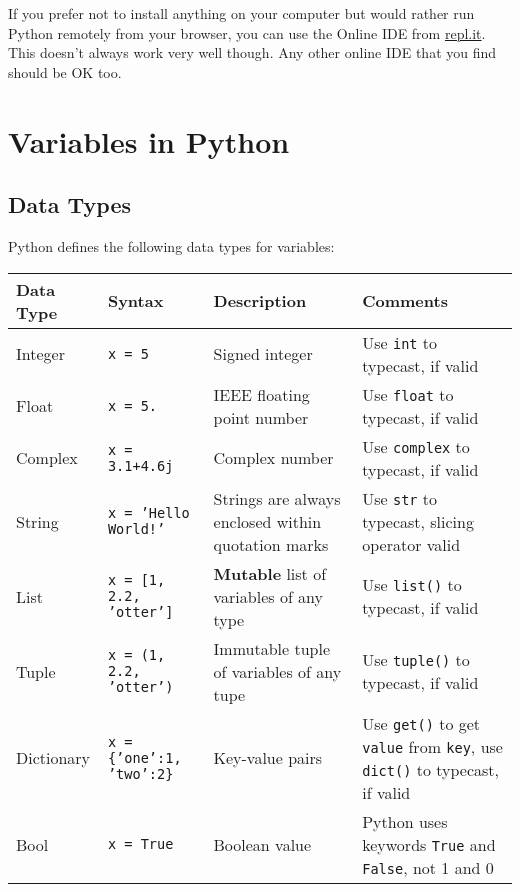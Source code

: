 \documentclass[12pt]{article}
\newcommand{\code}{\texttt}
\begin{document}
If you prefer not to install anything on your computer but would rather run Python remotely from your browser, you can use the Online IDE from \href{https://repl.it/languages/python3}{repl.it}. This doesn't always work very well though. Any other online IDE that you find should be OK too.

\newpage

\section{Variables in Python}
\subsection{Data Types}
Python defines the following data types for variables:

\begin{center}
\begin{tabular}{|p{0.75in}|p{1in}|p{1.5in}|p{1.5in}|}
\hline
\textbf{Data Type} & \textbf{Syntax} & \textbf{Description} & \textbf{Comments} \\ \hline
Integer & \code{x = 5} & Signed integer & Use \code{int} to typecast, if valid \\ \hline
Float & \code{x = 5.} & IEEE floating point number & Use \code{float} to typecast, if valid \\ \hline
Complex & \code{x = 3.1+4.6j} & Complex number & Use \code{complex} to typecast, if valid \\ \hline
String & \code{x = 'Hello World!'} & Strings are always enclosed within quotation marks & Use \code{str} to typecast, slicing operator valid \\ \hline
List & \code{x = [1, 2.2, 'otter']} & \textbf{Mutable} list of variables of any type & Use \code{list()} to typecast, if valid \\ \hline
Tuple & \code{x = (1, 2.2, 'otter')} & Immutable tuple of variables of any tupe & Use \code{tuple()} to typecast, if valid \\ \hline
Dictionary & \texttt{x = \{'one':1, 'two':2\}} & Key-value pairs & Use \code{get()} to get \code{value} from \code{key}, use \code{dict()} to typecast, if valid \\ \hline
Bool & \code{x = True} & Boolean value & Python uses keywords \code{True} and \code{False}, not 1 and 0 \\ \hline

\end{tabular}
\end{center}
\end{document}
